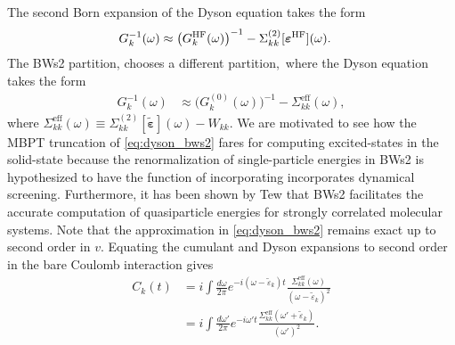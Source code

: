 \documentclass[%
 reprint,
 amsmath,amssymb,
 aps,
]{revtex4-2}
\begin{document}
The second Born expansion of the Dyson equation takes the form
\begin{align}
G^{-1}_k(\omega)
&\approx \left( G^{\rm{HF}}_k(\omega)\right)^{-1} - {\Sigma}^{(2)}_{kk}[\bm{\varepsilon}^{\rm HF}](\omega). \label{eq:dyson_born}
\end{align}
The BWs2 partition, chooses a different partition,\ where the Dyson equation takes the form
\begin{align}
G^{-1}_k(\omega)
&\approx ( G^{(0)}_k(\omega) \big)^{-1}
   - {\Sigma}^{\mathrm{eff}}_{kk}(\omega)\label{eq:dyson_bws2},
\end{align}
where  ${\Sigma}^{\mathrm{eff}}_{kk}(\omega) \equiv {\Sigma}^{(2)}_{kk}[\bm{\tilde{\varepsilon}}](\omega) - {W}_{kk}$. We are motivated to see how the MBPT truncation of \ref{eq:dyson_bws2} fares for computing excited-states in the solid-state because the renormalization of single-particle energies in BWs2 is hypothesized to have the function of incorporating incorporates dynamical screening. Furthermore, it has been shown by Tew that BWs2 facilitates the accurate computation of quasiparticle energies for strongly correlated molecular systems. Note that the approximation in \ref{eq:dyson_bws2} remains exact up to second order in $v$.
Equating the cumulant and Dyson expansions to second order in the bare Coulomb interaction gives 
\begin{align}
C_{k}(t)
&=
i \int \frac{d\omega}{2\pi}
e^{-i(\omega - \tilde{\varepsilon}_k)t}
\frac{\Sigma^{\mathrm{eff}}_{kk}(\omega)}
     {(\omega - \tilde{\varepsilon}_k)^2} \\
&=
i \int \frac{d\omega'}{2\pi}
e^{-i\omega' t}
\frac{\Sigma^{\mathrm{eff}}_{kk}(\omega' + \tilde{\varepsilon}_k)}
     {(\omega')^2}. %
\end{align}
\end{document}

